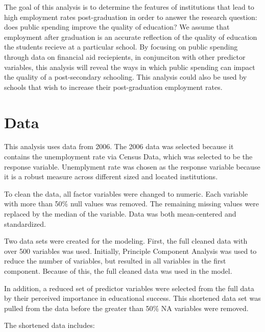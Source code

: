 \documentclass{article}\usepackage[]{graphicx}\usepackage[]{color}
\begin{document}
The goal of this analysis is to determine the features of institutions that lead to high employment rates post-graduation in order to answer the research question: does public spending improve the quality of education? We assume that employment after graduation is an accurate reflection of the quality of education the students recieve at a particular school. By focusing on public spending through data on financial aid reciepients, in conjunciton with other predictor variables, this analysis will reveal the ways in which public spending can impact the quality of a post-secondary schooling. This analysis could also be used by schools that wish to increase their post-graduation employment rates.
\maketitle
\section{Data}

This analysis uses data from 2006. The 2006 data was selected because it contains the unemployment rate via Census Data, which was selected to be the response variable. Unemplyment rate was chosen as the response variable because it is a robust measure across different sized and located institutions.

To clean the data, all factor variables were changed to numeric. Each variable with more than 50\% null values was removed. The remaining missing values were replaced by the median of the variable. Data was both mean-centered and standardized.

Two data sets were created for the modeling. First, the full cleaned data with over 500 variables was used. Initially, Principle Component Analysis was used to reduce the number of variables, but resulted in all variables in the first component. Because of this, the full cleaned data was used in the model.

In addition, a reduced set of predictor variables were selected from the full data by their perceived importance in educational success. This shortened data set was pulled from the data before the greater than 50\% NA variables were removed. 

The shortened data includes:
\end{document}
